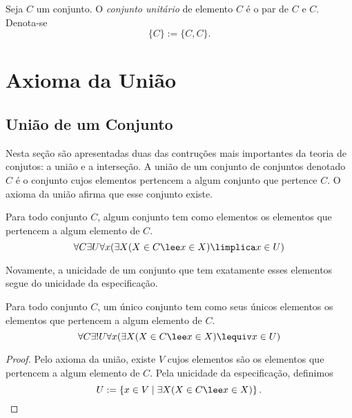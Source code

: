 \begin{defi}
Seja $C$ um conjunto. O \emph{conjunto unitário} de elemento $C$ é o par de $C$ e $C$. Denota-se
	\begin{equation*}
	\{C\} := \{C,C\}.
	\end{equation*}
\end{defi}

\section{Axioma da União}

\subsection{União de um Conjunto}

Nesta seção são apresentadas duas das contruções mais importantes da teoria de conjutos: a união e a interseção. A união de um conjunto de conjuntos denotado $C$ é o conjunto cujos elementos pertencem a algum conjunto que pertence $C$. O axioma da união afirma que esse conjunto existe.

\begin{axi}[União]
Para todo conjunto $C$, algum conjunto tem como elementos os elementos que pertencem a algum elemento de $C$.
	\begin{equation*}
	\forall C \exists U \forall x(\exists X(X \in C \lee x \in X) \limplica x \in U)
	\end{equation*}
\end{axi}

Novamente, a unicidade de um conjunto que tem exatamente esses elementos segue do unicidade da especificação.

\begin{prop}
Para todo conjunto $C$, um único conjunto tem como seus únicos elementos os elementos que pertencem a algum elemento de $C$.
	\begin{equation*}
	\forall C \exists! U \forall x(\exists X(X \in C \lee x \in X) \lequiv x \in U)
	\end{equation*}
\end{prop}
\begin{proof}
Pelo axioma da união, existe $V$ cujos elementos são os elementos que pertencem a algum elemento de $C$. Pela unicidade da especificação, definimos
	\begin{equation*}
	U := \set{x \in V}{\exists X(X \in C \lee x \in X)}. \qedhere
	\end{equation*}
\end{proof}

